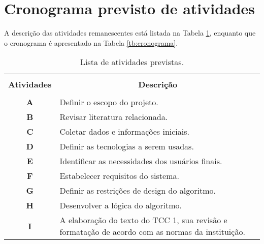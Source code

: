 \documentclass[tcc1,project]{classe_uftex/uftex}
\begin{document}
\section*{Cronograma previsto de atividades \label{sec:crono}}

A descrição das atividades remanescentes está listada na Tabela \ref{tb:atividades}, enquanto que o cronograma é apresentado na Tabela \ref{tb:cronograma}.


\begin{table}[!h]
  \centering
  \caption{Lista de atividades previstas.}\label{tb:atividades}
  \begin{tabular}{cp{9.4cm}}
    \hline \hline &\\[-0.4cm]
    {\bf Atividades} & \multicolumn{1}{c}{\bf Descrição} \\
    \hline
    &\\[-0.4cm]
    \textbf{A} &  Definir o escopo do projeto. \\[0.2cm]
    \textbf{B} &  Revisar literatura relacionada.\\[0.2cm]
    \textbf{C} &  Coletar dados e informações iniciais.\\[0.2cm]
    \textbf{D} &  Definir as tecnologias a serem usadas. \\[0.2cm]
    \textbf{E} &  Identificar as necessidades dos usuários finais. \\[0.2cm]
    \textbf{F} &  Estabelecer requisitos do sistema.\\[0.2cm]
    \textbf{G} &  Definir as restrições de design do algoritmo.\\[0.2cm]
    \textbf{H} &  Desenvolver a lógica do algoritmo. \\[0.2cm]
    \textbf{I} &  A elaboração do texto do TCC 1, sua revisão e formatação de acordo com as normas da instituição. \\[0.2cm]
    \hline \hline
  \end{tabular}
\end{table}



\end{document}
